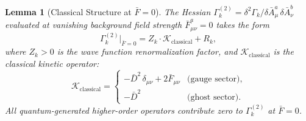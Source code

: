 \documentclass[12pt,a4paper]{article}
\theoremstyle{plain}
\newtheorem{lemma}[theorem]{Lemma}
\theoremstyle{definition}
\theoremstyle{remark}
\begin{document}
\begin{lemma}[Classical Structure at $\bar{F}=0$]\label{lem:cl}
The Hessian $\Gamma_k^{(2)}=\delta^2\Gamma_k/\delta\bar{A}_\mu^a\,\delta\bar{A}_\nu^b$ evaluated at vanishing background field strength $\bar{F}_{\mu\nu}^a=0$ takes the form
\begin{equation}\label{eq:classical}
\Gamma_k^{(2)}\big|_{\bar{F}=0} = Z_k\cdot\mathcal{K}_{\mathrm{classical}} + R_k,
\end{equation}
where $Z_k>0$ is the wave function renormalization factor, and $\mathcal{K}_{\mathrm{classical}}$ is the classical kinetic operator:
\begin{equation}
\mathcal{K}_{\mathrm{classical}} = \begin{cases}
-\bar{D}^2\,\delta_{\mu\nu} + 2\bar{F}_{\mu\nu} &\text{(gauge sector)},\\
-\bar{D}^2 &\text{(ghost sector)}.
\end{cases}
\end{equation}
All quantum-generated higher-order operators contribute zero to $\Gamma_k^{(2)}$ at $\bar{F}=0$.
\end{lemma}
\end{document}
